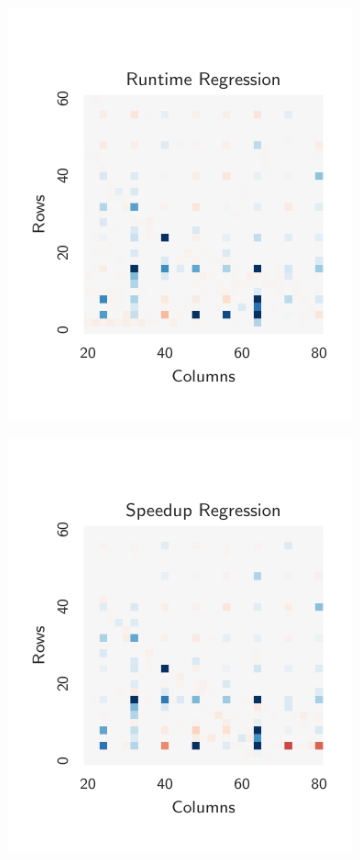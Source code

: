 \documentclass[nonatbib,preprint,10pt]{sigplanconf}
\begin{document}
\begin{figure}
\begin{subfigure}[t]{0.48\columnwidth}
\includegraphics[width=\columnwidth]{img/reg_runtime_heatmap}
\vspace{-1.5em} %
\caption{}
\label{fig:class-hmaps-5}
\end{subfigure}
\begin{subfigure}[t]{0.48\columnwidth}
\centering
\includegraphics[width=\columnwidth]{img/reg_speedup_heatmap}

\end{subfigure}
\end{figure}
\end{document}
